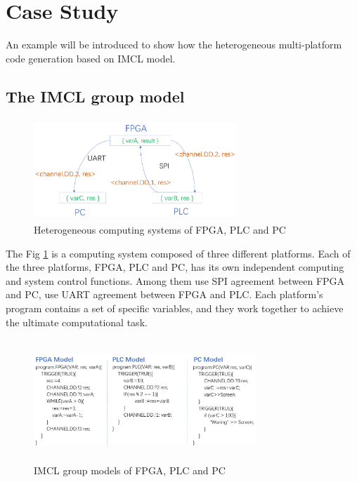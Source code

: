 \section{Case Study}
An example will be introduced to show how the heterogeneous multi-platform code generation based on IMCL model.


\subsection{The IMCL group model}

\begin{figure}[!htb]
  \centering
        \includegraphics[height=1.5in, width=3.0in]{Compute_example}
  \caption{Heterogeneous computing systems of FPGA, PLC and PC}\label{Compute_example}
\end{figure}
The Fig \ref{Compute_example} is a computing system composed of three different platforms. Each of the three platforms, FPGA, PLC and PC, has its own independent computing and system control functions. Among them use SPI agreement between FPGA and PC, use UART agreement between FPGA and PLC. Each platform's program contains a set of specific variables, and they work together to achieve the ultimate computational task.

\begin{figure}[!tb]
  \centering
        \includegraphics[height=1.8in, width=3.3in]{IMCL_group_models}
  \caption{IMCL group models of FPGA, PLC and PC}\label{group_models}
\end{figure}


